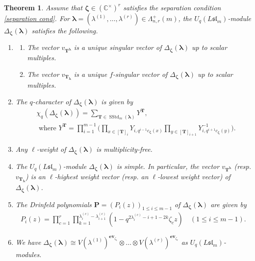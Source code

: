 \documentclass[12pt]{amsart}
\newtheorem{thm}{Theorem}[section]
\numberwithin{equation}{thm}
\newcommand\CC{\mathbb C}
\newcommand\bP{\mathbf P}
\newcommand\bT{\mathbf T}
\newcommand\z{\zeta}
\newcommand\la{\lambda}
\newcommand\D{\Delta}
\newcommand\vL{\varLambda}
\newcommand\Bz{\boldsymbol\zeta}
\newcommand\Bla{\boldsymbol\lambda}
\newcommand\Fsl{\mathfrak{sl}}
\newcommand\ev{\mathbf{{ev}}}
\newcommand{\SStd}{\operatorname{SStd}}
\newcounter{ni}
\begin{document}

\begin{thm}
\label{Thm DBz Bla}
Assume that $\Bz \in (\CC^{\times})^r$ satisfies the separation condition \eqref{separation cond}. 
For $\Bla =(\la^{(1)},\dots, \la^{(r)}) \in \vL_{n,r}^+(m)$, 
the $U_q (L\Fsl_m)$-module $\D_{\Bz} (\Bla)$ satisfies the following. 

\begin{enumerate}
\item 
\begin{enumerate} 
\item The vector $v_{\bT^{\Bla}}$ is a unique singular vector of $\D_{\Bz} (\Bla)$ up to scalar multiples. 

\item 
The vector $v_{\bT_{\Bla}}$ is a unique $f$-singular vector of $\D_{\Bz} (\Bla)$  up to scalar multiples. 
\end{enumerate} 

\item 
The $q$-character of $\D_{\Bz} (\Bla)$ is given by 
\begin{align*}
&\chi_q(\D_{\Bz}(\Bla)) = \sum_{\bT \in \SStd_m(\Bla)} Y^{\bT}, 
\\
&\text{ where }
Y^{\bT} = \prod_{i=1}^{m-1} 
	\Big( \prod_{x \in [\bT]_i} Y_{i, q^{i-1} c_{\Bz} (x)} \prod_{ y \in [\bT]_{i+1}} Y_{i, q^{i+1} c_{\Bz} (y)}^{-1} \Big).
\end{align*} 

\item 
Any $\ell$-weight of $\D_{\Bz} (\Bla)$ is multiplicity-free. 

\item 
The $U_q (L \Fsl_m)$-module $\D_{\Bz} (\Bla)$ is simple. 
In particular, the vector $v_{\bT^{\Bla}}$ (resp. $v_{\bT_{\Bla}}$) is an $\ell$-highest weight vector 
(resp. an $\ell$-lowest weight vector) of $\D_{\Bz} (\Bla)$. 

\item 
The Drinfeld polynomials $\bP =(P_i(z))_{1 \leq i \leq m-1}$ of $\D_{\Bz} (\Bla)$ are given by 
\begin{align*}
P_i(z) = \prod_{c=1}^r\prod_{k=1}^{\la_i^{(c)} - \la_{i+1}^{(c)}} (1 -   q^{2 \la_i^{(c)} - i+1 -2k} \z_c z)
\quad (1 \leq i \leq m-1).
\end{align*}



\item 
We have 
$\D_{\Bz} (\Bla) \cong V(\la^{(1)})^{\ev_{\z_1}}  \otimes \dots \otimes V (\la^{(r)})^{\ev_{\z_r}}$ as $U_q (L\Fsl_m)$-modules. 
\end{enumerate}


\end{thm}
\end{document}
